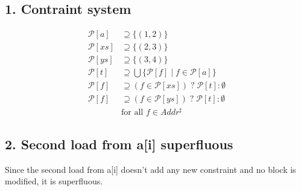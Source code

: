 \documentclass[11pt,a4paper]{scrartcl}
\begin{document}
\subsection*{1. Contraint system}
\begin{align*}
\mathcal{P}[a] &\supseteq \{(1,2)\}\\
\mathcal{P}[xs] &\supseteq \{(2,3)\}\\
\mathcal{P}[ys] &\supseteq \{(3,4)\}\\
\mathcal{P}[t] &\supseteq \bigcup \{\mathcal{P}[f]\;|\;f \in \mathcal{P}[a]\}\\
\mathcal{P}[f] &\supseteq (f \in \mathcal{P}[xs])\;?\;\mathcal{P}[t] : \emptyset\\
\mathcal{P}[f] &\supseteq (f \in \mathcal{P}[ys])\;?\;\mathcal{P}[t] : \emptyset\\
&\text{for all $f \in Addr^\sharp$}
\end{align*}

\subsection*{2. Second load from a[i] superfluous}
Since the second load from a[i] doesn't add any new constraint and no block is modified, it is superfluous.
\end{document}
